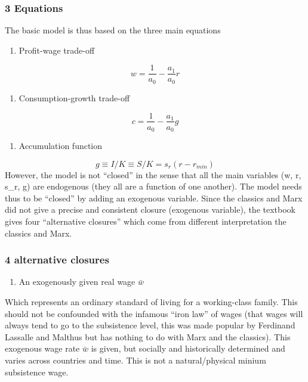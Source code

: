 \documentclass[
  letterpaper,
  DIV=11,
  numbers=noendperiod]{scrreprt}
\providecommand{\tightlist}{%
  \setlength{\itemsep}{0pt}\setlength{\parskip}{0pt}}\usepackage{longtable,booktabs,array}
\begin{document}
\hypertarget{equations}{%
\subsubsection{3 Equations}\label{equations}}

The basic model is thus based on the three main equations

\begin{enumerate}
\def\labelenumi{\arabic{enumi}.}
\tightlist
\item
  Profit-wage trade-off
\end{enumerate}

\[
w = \frac{1}{a_0}-\frac{a_1}{a_0}r
\]

\begin{enumerate}
\def\labelenumi{\arabic{enumi}.}
\setcounter{enumi}{1}
\tightlist
\item
  Consumption-growth trade-off
\end{enumerate}

\[
c = \frac{1}{a_0}-\frac{a_1}{a_0}g
\]

\begin{enumerate}
\def\labelenumi{\arabic{enumi}.}
\setcounter{enumi}{2}
\tightlist
\item
  Accumulation function
\end{enumerate}

\[
g \equiv I/K \equiv S/K = s_r(r-r_{min})
\] However, the model is not ``closed'' in the sense that all the main
variables (w, r, s\_r, g) are endogenous (they all are a function of one
another). The model needs thus to be ``closed'' by adding an exogenous
variable. Since the classics and Marx did not give a precise and
consistent closure (exogenous variable), the textbook gives four
``alternative closures'' which come from different interpretation the
classics and Marx.

\hypertarget{alternative-closures}{%
\subsubsection{4 alternative closures}\label{alternative-closures}}

\begin{enumerate}
\def\labelenumi{\arabic{enumi}.}
\tightlist
\item
  An exogenously given real wage \(\bar{w}\)
\end{enumerate}

Which represents an ordinary standard of living for a working-class
family. This should not be confounded with the infamous ``iron law'' of
wages (that wages will always tend to go to the subsistence level, this
was made popular by Ferdinand Lassalle and Malthus but has nothing to do
with Marx and the classics). This exogenous wage rate \(\bar{w}\) is
given, but socially and historically determined and varies across
countries and time. This is not a natural/physical minium subsistence
wage.
\end{document}
